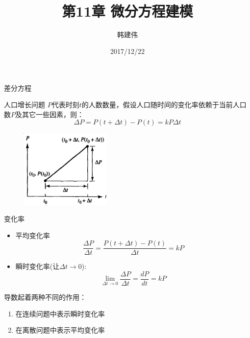\documentclass[mathserif, table]{beamer}
\title{第11章 微分方程建模}
\author{韩建伟}
\institute{
  信息学院\\
  \texttt{mm@hanjianwei.com}
}
\date{2017/12/22}
\begin{document}
\begin{frame}[plain]
  \titlepage{}
\end{frame}

\begin{frame}{差分方程}
  
  \begin{block}{人口增长问题}
    $P$代表时刻$t$的人数数量，假设人口随时间的变化率依赖于当前人口数$P$及其它一些因素，则：
    \[
    \Delta P = P(t+\Delta t) - P(t) = kP\Delta t
    \]
  \end{block}

  \begin{figure}
    \centering
    \includegraphics[width=0.4\textwidth]{diff.png}
  \end{figure}
  
\end{frame}

\begin{frame}{变化率}
  \begin{itemize}
  \item 平均变化率
    \[
    \frac{\Delta P}{\Delta t} = \frac{P(t+\Delta t) - P(t)}{\Delta t} = kP
    \]
  \item 瞬时变化率(让$\Delta t \rightarrow 0$):
    \[
    \lim_{\Delta t \rightarrow 0} \frac{\Delta P}{\Delta t} =\frac{d P}{d t} =kP
    \]
  \end{itemize}

  导数起着两种不同的作用：

  \begin{enumerate}
  \item 在连续问题中表示瞬时变化率
  \item 在离散问题中表示平均变化率
  \end{enumerate}

\end{frame}
\end{document}
